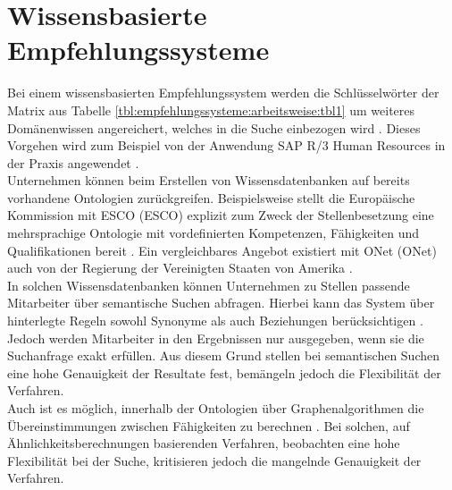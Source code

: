 \section{Wissensbasierte Empfehlungssysteme}
\label{ch:empfehlungssysteme:wissensbasierteAnsaetze}
Bei einem wissensbasierten Empfehlungssystem werden die Schlüsselwörter der Matrix aus Tabelle \ref{tbl:empfehlungssysteme:arbeitsweise:tbl1} um weiteres Domänenwissen angereichert, welches in die Suche einbezogen wird \cite[S. 168f.]{recommenderSystems:2016}. Dieses Vorgehen wird zum Beispiel von der Anwendung SAP R/3 Human Resources in der Praxis angewendet \cite[S. 2]{malinowski:2006}.\\
Unternehmen können beim Erstellen von Wissensdatenbanken auf bereits vorhandene Ontologien zurückgreifen. Beispielsweise stellt die Europäische Kommission mit \acs{ESCO} (\acl{ESCO}) explizit zum Zweck der Stellenbesetzung eine mehrsprachige Ontologie mit vordefinierten Kompetenzen, Fähigkeiten und Qualifikationen bereit \cite[S. 1ff.]{leVrang:2014}. Ein vergleichbares Angebot existiert mit \acs{ONet} (\acl{ONet}) auch von der Regierung der Vereinigten Staaten von Amerika \cite[S. 2]{aCombinedRepresentation:2018}.\\
In solchen Wissensdatenbanken können Unternehmen zu Stellen passende Mitarbeiter über semantische Suchen abfragen. Hierbei kann das System über hinterlegte Regeln sowohl Synonyme als auch Beziehungen berücksichtigen \cite[S. 2f.]{singto:2013}. Jedoch werden Mitarbeiter in den Ergebnissen nur ausgegeben, wenn sie die Suchanfrage exakt erfüllen. Aus diesem Grund stellen \textcite[S. 3]{bianchini:2008} bei semantischen Suchen eine hohe Genauigkeit der Resultate fest, bemängeln jedoch die Flexibilität der Verfahren.\\
Auch ist es möglich, innerhalb der Ontologien über Graphenalgorithmen die Übereinstimmungen zwischen Fähigkeiten zu berechnen \cite[S. 1f.]{balachander:2018}. Bei solchen, auf Ähnlichkeitsberechnungen basierenden Verfahren, beobachten \textcite[S. 4]{bianchini:2008} eine hohe Flexibilität bei der Suche, kritisieren jedoch die mangelnde Genauigkeit der Verfahren.\\
